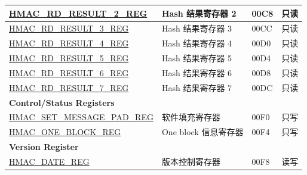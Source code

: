 \begin{longtable}{ | p{6cm} | p{7.2cm} | p{1.3cm} | p{1cm} | }
\hyperref[regdesc:HMACRDRESULTNREG]{HMAC\_RD\_RESULT\_2\_REG} & Hash 结果寄存器 2 & \hexprefix{}00C8 & 只读 \\ \hline
\hyperref[regdesc:HMACRDRESULTNREG]{HMAC\_RD\_RESULT\_3\_REG} & Hash 结果寄存器 3 & \hexprefix{}00CC & 只读 \\ \hline
\hyperref[regdesc:HMACRDRESULTNREG]{HMAC\_RD\_RESULT\_4\_REG} & Hash 结果寄存器 4 & \hexprefix{}00D0 & 只读 \\ \hline
\hyperref[regdesc:HMACRDRESULTNREG]{HMAC\_RD\_RESULT\_5\_REG} & Hash 结果寄存器 5 & \hexprefix{}00D4 & 只读 \\ \hline
\hyperref[regdesc:HMACRDRESULTNREG]{HMAC\_RD\_RESULT\_6\_REG} & Hash 结果寄存器 6 & \hexprefix{}00D8 & 只读 \\ \hline
\hyperref[regdesc:HMACRDRESULTNREG]{HMAC\_RD\_RESULT\_7\_REG} & Hash 结果寄存器 7 & \hexprefix{}00DC & 只读 \\ \hline
\multicolumn{4}{|l|}{\textbf{Control/Status Registers}} \\ \hline
\hyperref[regdesc:HMACSETMESSAGEPADREG]{HMAC\_SET\_MESSAGE\_PAD\_REG} & 软件填充寄存器 & \hexprefix{}00F0 & 只写 \\ \hline
\hyperref[regdesc:HMACONEBLOCKREG]{HMAC\_ONE\_BLOCK\_REG} & One block 信息寄存器 & \hexprefix{}00F4 & 只写 \\ \hline
\multicolumn{4}{|l|}{\textbf{Version Register}} \\ \hline
\hyperref[regdesc:HMACDATEREG]{HMAC\_DATE\_REG} & 版本控制寄存器 & \hexprefix{}00F8 & 读写 \\ \hline
\end{longtable}
